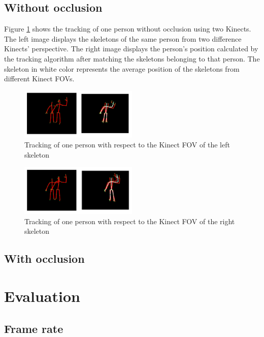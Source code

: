 \documentclass[paper=a4, fontsize=11pt]{scrartcl}
\numberwithin{equation}{section}		%
\numberwithin{figure}{section}			%
\numberwithin{table}{section}				%
\begin{document}
\subsection{Without occlusion}

Figure \ref{fig:fov1_all} shows the tracking of one person without occlusion using two Kinects. The left image displays the skeletons of the same person from two difference Kinects' perspective. The right image displays the person's position calculated by the tracking algorithm after matching the skeletons belonging to that person. The skeleton in white color represents the average position of the skeletons from different Kinect FOVs. 

\begin{figure}[H]
	\centering
	\includegraphics[width=0.5\textwidth]{fov1_all}
	\caption{Tracking of one person with respect to the Kinect FOV of the left skeleton}
	\label{fig:fov1_all}
\end{figure}

\begin{figure}[H]
	\centering
	\includegraphics[width=0.5\textwidth]{fov2_all}
	\caption{Tracking of one person with respect to the Kinect FOV of the right skeleton}
	\label{fig:fov2_all}
\end{figure}

\subsection{With occlusion}

\section{Evaluation}

\subsection{Frame rate}
\end{document}
